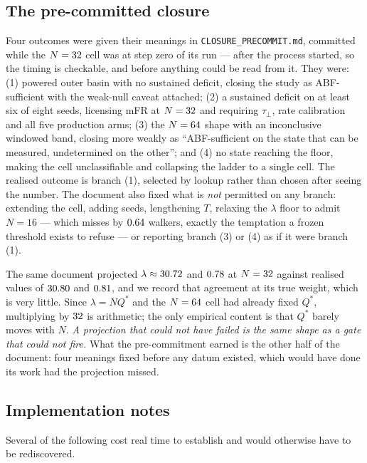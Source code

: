 \subsection{The pre-committed closure}

Four outcomes were given their meanings in \texttt{CLOSURE\_PRECOMMIT.md}, committed while the
$N = 32$ cell was at step zero of its run --- after the process started, so the timing is
checkable, and before anything could be read from it. They were: (1) powered outer basin with no
sustained deficit, closing the study as ABF-sufficient with the weak-null caveat attached; (2) a
sustained deficit on at least six of eight seeds, licensing mFR at $N = 32$ and requiring
$\tau_\perp$, rate calibration and all five production arms; (3) the $N = 64$ shape with an
inconclusive windowed band, closing more weakly as ``ABF-sufficient on the state that can be
measured, undetermined on the other''; and (4) no state reaching the floor, making the cell
unclassifiable and collapsing the ladder to a single cell. The realised outcome is branch (1),
selected by lookup rather than chosen after seeing the number. The document also fixed what is
\emph{not} permitted on any branch: extending the cell, adding seeds, lengthening $T$, relaxing
the $\lambda$ floor to admit $N = 16$ --- which misses by $0.64$ walkers, exactly the
temptation a frozen threshold exists to refuse --- or reporting branch (3) or (4) as if it were
branch (1).

The same document projected $\lambda \approx 30.72$ and $0.78$ at $N = 32$
against realised values of $30.80$ and $0.81$, and we record that agreement at its
true weight, which is very little. Since $\lambda = N Q^*$ and the $N = 64$ cell had already
fixed $Q^*$, multiplying by $32$ is arithmetic; the only empirical content is that $Q^*$
barely moves with $N$. \emph{A projection that could not have failed is the same shape as a gate
that could not fire.} What the pre-commitment earned is the other half of the document: four
meanings fixed before any datum existed, which would have done its work had the projection
missed.

\subsection{Implementation notes}
\label{sec:nacl_impl}

Several of the following cost real time to establish and would otherwise have to be rediscovered.

